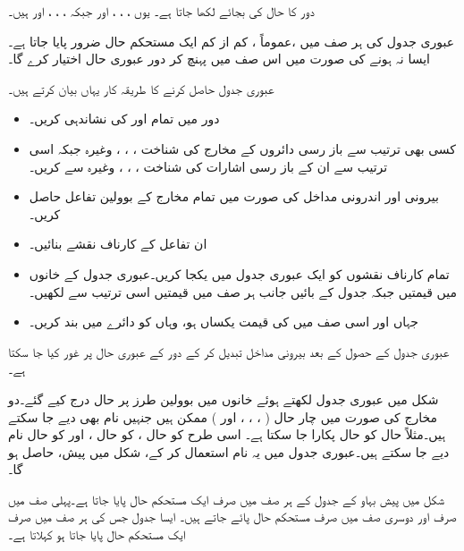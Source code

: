 دور کا حال   کی بجائے   لکھا جاتا ہے۔ یوں  ، ، ، اور   جبکہ ، ، ، اور  ہیں۔
 
عبوری جدول کی  ہر صف میں ،عموماً ، کم از کم ایک مستحکم حال ضرور پایا جاتا ہے۔ایسا نہ ہونے کی صورت میں  اس صف میں پہنچ کر  دور  عبوری حال اختیار کرے گا۔

عبوری جدول حاصل کرنے کا طریقہ  کار  یہاں بیان کرتے ہیں۔
\begin{itemize}
\item
دور میں      تمام   اور  کی نشاندہی  کریں۔
\item
 کسی بھی ترتیب سے باز رسی دائروں کے مخارج کی شناخت ، ، ، وغیرہ جبکہ اسی ترتیب سے ان کے باز رسی اشارات کی شناخت ،  ، ،  وغیرہ سے  کریں۔
\item
 بیرونی اور اندرونی مداخل کی صورت میں        تمام مخارج کے بوولین تفاعل حاصل کریں۔
\item    
    ان تفاعل کے کارناف نقشے بنائیں۔
\item 
  تمام کارناف نقشوں کو ایک عبوری جدول میں یکجا کریں۔عبوری جدول کے خانوں میں      قیمتیں جبکہ جدول کے بائیں جانب ہر صف میں    قیمتیں اسی ترتیب سے لکھیں۔
\item    
     جہاں  اور اسی صف میں  کی قیمت یکساں ہو، وہاں  کو دائرے میں بند کریں۔
    \end{itemize}
عبوری جدول کے حصول کے بعد بیرونی مداخل تبدیل کر کے دور کے عبوری حال   پر غور کیا  جا سکتا ہے۔ 

شکل میں عبوری جدول لکھتے   ہوئے  خانوں میں بوولین طرز  پر حال  درج کیے  گئے۔دو مخارج کی صورت میں  چار  حال (  ، ، ، اور  ) ممکن ہیں جنہیں  نام بھی دیے جا سکتے ہیں۔مثلاً حال   کو حال  پکارا جا سکتا ہے۔ اسی طرح  کو حال ،  کو حال ، اور  کو  حال  نام دیے جا سکتے ہیں۔عبوری جدول میں یہ نام استعمال کر کے، شکل   میں پیش،    حاصل ہو گا۔

شکل     میں پیش  بہاو کے جدول کے ہر صف میں صرف ایک  مستحکم حال پایا جاتا  ہے۔پہلی صف میں صرف     اور دوسری صف میں صرف   مستحکم حال  پائے جاتے ہیں۔ ایسا جدول جس  کی ہر  صف میں صرف ایک مستحکم حال  پایا جاتا  ہو  کہلاتا ہے۔


